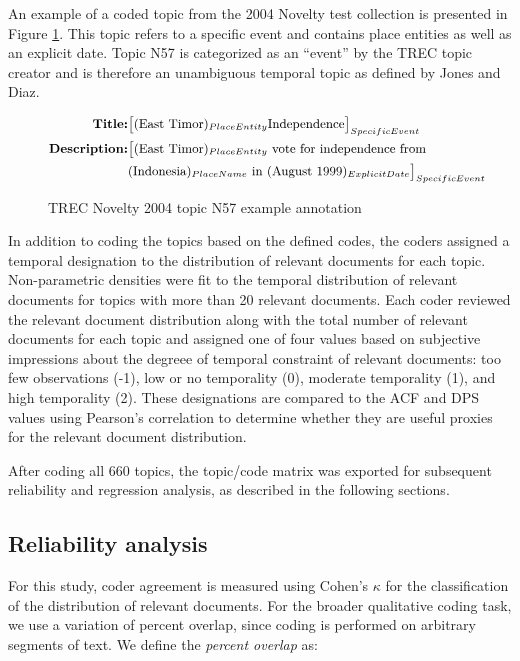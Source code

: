 \documentclass[runningheads,a4paper]{llncs}
\begin{document}
An example of a coded topic from the 2004 Novelty test collection is presented in Figure \ref{fig.example}.  This topic refers to a specific event and contains place entities as well as an explicit date.  Topic N57 is categorized as an ``event'' by the TREC topic creator and is therefore an unambiguous temporal topic as defined by Jones and Diaz.

\begin{figure}[!ht]
\begin{equation*}
\small
\begin{split}
\mbox{\bf{Title}:} & \big[(\mbox{East Timor})_{PlaceEntity} \mbox{Independence}\big]_{SpecificEvent} \\
\mbox{\bf{Description}:} & \big[  (\mbox{East Timor})_{PlaceEntity} \mbox{ vote for independence from } \\
	& (\mbox{Indonesia})_{PlaceName} \mbox{ in } (\mbox{August 1999})_{ExplicitDate}\big]_{SpecificEvent}
\end{split}
\end{equation*}
\caption{TREC Novelty 2004 topic N57 example annotation}
\label{fig.example}
\end{figure}

In addition to coding the topics based on the defined codes, the coders assigned a temporal designation to the distribution of relevant documents for each topic. Non-parametric densities were fit to the temporal distribution of relevant documents for topics with more than 20 relevant documents. Each coder reviewed the relevant document distribution along with the total number of relevant documents for each topic and assigned one of four values based on subjective impressions about the degreee of temporal constraint of relevant documents:  too few observations (-1), low or no temporality (0), moderate temporality (1), and high temporality (2). These designations are compared to the ACF and DPS values using Pearson's correlation to determine whether they are useful proxies for the relevant document distribution.
 
After coding all 660 topics, the topic/code matrix was exported for subsequent reliability and regression analysis, as described in the following sections. 

\subsection{Reliability analysis}

For this study, coder agreement is measured using Cohen's $\kappa$ for the classification of the distribution of relevant documents. For the broader qualitative coding task, we use a variation of percent overlap, since coding is performed on arbitrary segments of text. We define the \emph{percent overlap} as:
\end{document}
